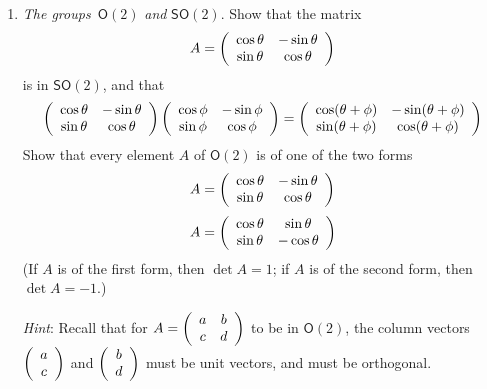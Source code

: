 \documentclass[12pt]{amsbook}
\theoremstyle{plain}
\numberwithin{equation}{chapter}
\numberwithin{theorem}{chapter}
\begin{document}
\begin{enumerate}
\item \label{so2}\textit{The groups}\emph{\ }$\mathsf{O}(2)$ \textit{and}
$\mathsf{SO}(2)$. Show that the matrix
\[
A=\left(
\begin{array}
[c]{cc}%
\cos\theta & -\sin\theta\\
\sin\theta & \cos\theta
\end{array}
\right)
\]
is in $\mathsf{SO}(2)$, and that
\[
\left(
\begin{array}
[c]{cc}%
\cos\theta & -\sin\theta\\
\sin\theta & \cos\theta
\end{array}
\right)  \left(
\begin{array}
[c]{cc}%
\cos\phi & -\sin\phi\\
\sin\phi & \cos\phi
\end{array}
\right)  =\left(
\begin{array}
[c]{cc}%
\cos(\theta+\phi) & -\sin(\theta+\phi)\\
\sin(\theta+\phi) & \cos(\theta+\phi)
\end{array}
\right)
\]
Show that every element $A$ of $\mathsf{O}(2)$ is of one of the two forms
\[
A=\left(
\begin{array}
[c]{cc}%
\cos\theta & -\sin\theta\\
\sin\theta & \cos\theta
\end{array}
\right)
\]%
\[
A=\left(
\begin{array}
[c]{cc}%
\cos\theta & \sin\theta\\
\sin\theta & -\cos\theta
\end{array}
\right)
\]
(If $A$ is of the first form, then $\det A=1$; if $A$ is of the second form,
then $\det A=-1$.)

\textit{Hint}: Recall that for $A=\left(
\begin{array}
[c]{cc}%
a & b\\
c & d
\end{array}
\right)  $ to be in $\mathsf{O}(2)$, the column vectors $\left(
\begin{array}
[c]{c}%
a\\
c
\end{array}
\right)  $ and $\left(
\begin{array}
[c]{c}%
b\\
d
\end{array}
\right)  $ must be unit vectors, and must be orthogonal.


\end{enumerate}
\end{document}
